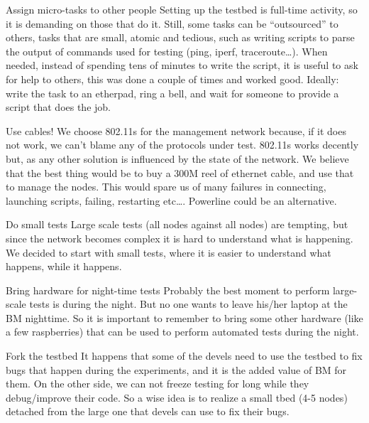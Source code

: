 \documentclass[10pt,onecolumn]{paper}
\begin{document}
\begin{mybox}{Assign micro-tasks to other people}
    Setting up the testbed is full-time activity, so it is demanding on those
    that do it. Still, some tasks can be ``outsourced'' to others, tasks that
    are small, atomic and tedious, such as writing scripts to parse the output
    of commands  used for testing (ping, iperf, traceroute\ldots). When needed,
    instead of spending tens of minutes to write the script, it is useful to ask
    for help to others, this was done a couple of times and worked good.
    Ideally: write the task to an etherpad, ring a bell, and wait for someone to
    provide a script that does the job.
\end{mybox}

\begin{mybox}{Use cables!}
    We choose 802.11s for the management network because, if it does not work,
    we can't blame any of the protocols under test. 802.11s works decently but,
    as any other solution is influenced by the state of the network. We believe
    that the best thing would be to buy a 300M reel of ethernet cable, and use
    that to manage the nodes. This would spare us of many failures in
    connecting, launching scripts, failing, restarting etc\ldots. Powerline
    could be an alternative.
\end{mybox}
\begin{mybox}{Do small tests}
    Large scale tests (all nodes against all nodes) are tempting, but since the
    network becomes complex it is hard to understand what is happening. We
    decided to start with small tests, where it is easier to understand what
    happens, while it happens. 
\end{mybox}
\begin{mybox}{Bring hardware for night-time tests}
    Probably the best moment to perform large-scale tests is during the night.
    But no one wants to leave his/her laptop at the BM nighttime. So it is
    important to remember to bring some other hardware (like a few raspberries)
    that can be used to perform automated tests during the night. 
\end{mybox}

\begin{mybox}{Fork the testbed}
    It happens that some of the devels need to use the testbed to fix bugs that
    happen during the experiments, and it is the added value of BM for them. On
    the other side, we can not freeze testing for long while they debug/improve
    their code. So a wise idea is to realize a small tbed (4-5 nodes) detached
    from the large one that devels can use to fix their bugs. 
\end{mybox}
\end{document}
